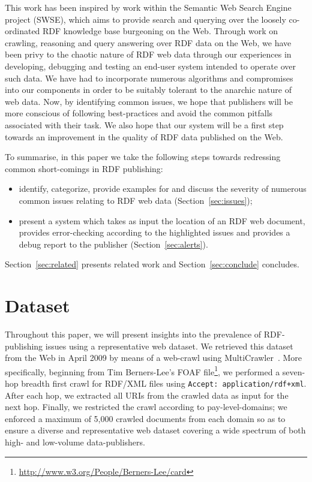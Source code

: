 \documentclass{llncs}
\begin{document}
This work has been inspired by work within the Semantic Web Search Engine project (SWSE), which aims to provide search and querying over the loosely co-ordinated RDF knowledge base burgeoning on the Web.
Through work on crawling, reasoning and query answering over RDF data on the Web, we have been privy to the chaotic nature of RDF web data through our experiences in developing, debugging and testing an end-user system intended to operate over such data.
We have had to incorporate numerous algorithms and compromises into our components in order to be suitably tolerant to the anarchic nature of web data.
Now, by identifying common issues, we hope that publishers will be more conscious of following best-practices and avoid the common pitfalls associated with their task.
We also hope that our system will be a first step towards an improvement in the quality of RDF data published on the Web.

To summarise, in this paper we take the following steps towards redressing common short-comings in RDF publishing:
\begin{itemize}
\item identify, categorize, provide examples for and discuss the severity of numerous common issues relating to RDF web data (Section~\ref{sec:issues});
\item present a system which takes as input the location of an RDF web document, provides error-checking according to the highlighted issues and provides a debug report to the publisher (Section~\ref{sec:alerts}).
\end{itemize}

\noindent
Section~\ref{sec:related} presents related work and Section~\ref{sec:conclude} concludes.

\section{Dataset}\label{sec:data}
Throughout this paper, we will present insights into the prevalence of RDF-publishing issues using a representative web dataset.
We retrieved this dataset from the Web in April 2009 by means of a web-crawl using MultiCrawler~\cite{key:multi06}. More specifically, beginning from Tim Berners-Lee's FOAF file\footnote{\url{http://www.w3.org/People/Berners-Lee/card}}, we performed a seven-hop breadth first crawl for RDF/XML files using {\small\tt Accept: application/rdf+xml}. After each hop, we extracted all URIs from the crawled data as input for the next hop. Finally, we restricted the crawl according to pay-level-domains; we enforced a maximum of 5,000 crawled documents from each domain so as to ensure a diverse and representative web dataset covering a wide spectrum of both high- and low-volume data-publishers.
\end{document}
